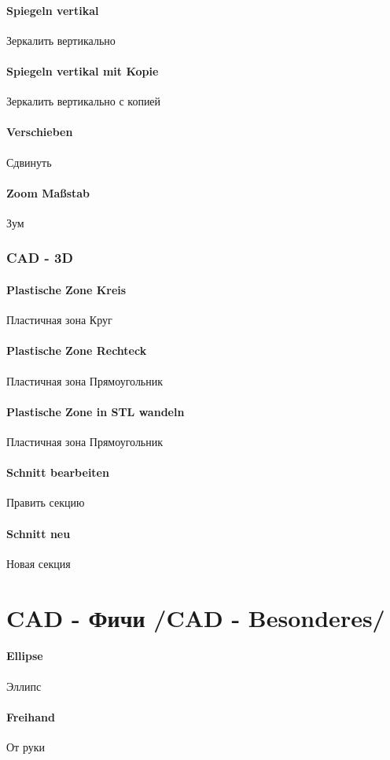 \documentclass[14pt,a4paper]{book}
\newcommand{\TRsubsection}[2]{\chapter{#2 /#1/}}
\begin{document}
			\subsubsection{Spiegeln vertikal}{Зеркалить вертикально}
			\subsubsection{Spiegeln vertikal mit Kopie}{Зеркалить вертикально с копией}
			\subsubsection{Verschieben}{Сдвинуть}
			\subsubsection{Zoom Maßstab}{Зум}
		\subsection{CAD - 3D}
			\subsubsection{Plastische Zone Kreis}{Пластичная зона Круг}
			\subsubsection{Plastische Zone Rechteck}{Пластичная зона Прямоугольник}
			\subsubsection{Plastische Zone in STL wandeln}{Пластичная зона Прямоугольник}
			\subsubsection{Schnitt bearbeiten}{Править секцию}
			\subsubsection{Schnitt neu}{Новая секция}
		\TRsubsection{CAD - Besonderes}{CAD - Фичи}
			\subsubsection{Ellipse}{Эллипс}
			\subsubsection{Freihand}{От руки}
\end{document}
